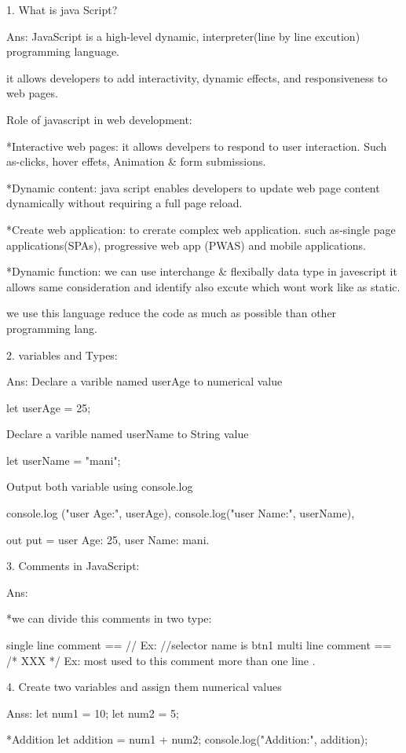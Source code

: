 1. What is java Script?

Ans:  JavaScript is a high-level dynamic, interpreter(line by line excution) programming language.

     it allows developers to add interactivity, dynamic effects, and 
     responsiveness to web pages.

Role of javascript in web development:

*Interactive web pages:
     it allows develpers to respond to user interaction.
     Such as-clicks, hover effets, Animation & form submissions.
   
*Dynamic content:
     java script enables developers to update web page content 
     dynamically without requiring a full page reload.

*Create web application:
     to crerate complex web application.
     such as-single page applications(SPAs),
     progressive web app (PWAS) and mobile applications.

*Dynamic function:
     we can use interchange & flexibally data type in javescript it allows same
     consideration and identify also excute which wont work like as static.

     we use this language reduce the code as much as possible than other 
     programming lang.

2. variables and Types:

Ans:
Declare a varible named userAge to numerical value

     let userAge = 25;

Declare a varible named userName to String value

     let userName = "mani";

Output both variable using console.log

           console.log ("user Age:", userAge),
           console.log("user Name:", userName),

out put = user Age: 25, user Name: mani.

3. Comments in JavaScript:

Ans:

*we can divide this comments in two type:

single line comment == // Ex: //selector name is btn1
multi line comment == /* XXX */  Ex: most used to this comment more than one line .

4. Create two variables and assign them numerical values

Anss:
let num1 = 10;
let num2 = 5;

*Addition
let addition = num1 + num2;
console.log("Addition:", addition);

